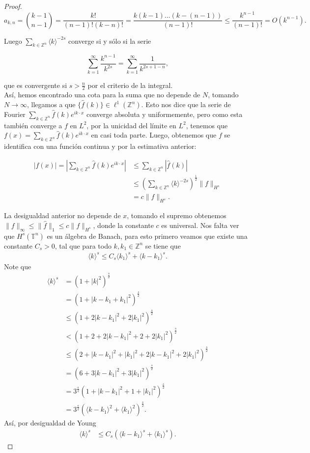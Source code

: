 \documentclass[12pt]{article}
\newcommand\Z{\ensuremath{\mathbb{Z}}}
\newcommand\T{\mathbb{T}}
\renewcommand{\hat}{\widehat}
\newcommand\jk{\langle k\rangle}
\begin{document}
\begin{proof}
$$a_{k,n}=\binom{k-1}{n-1}= \frac{k!}{(n-1)!(k-n)!}=\frac{k(k-1)\ldots(k-(n-1))}{(n-1)!}\leq \frac{k^{n-1}}{(n-1)!}=O(k^{n-1}).$$ 

Luego $\displaystyle\sum_{k \in \Z^n}\jk^{-2s}$ converge si y sólo si la serie

$$\sum_{k=1}^{\infty} \frac{k^{n-1}}{k^{2s}}=\sum_{k=1}^{\infty} \frac{1}{k^{2s+1-n}},$$

que es convergente si $s>\frac{n}{2}$ por el criterio de la integral.\\

Así, hemos encontrado una cota para la suma que no depende de $N$, tomando $N \rightarrow \infty$, llegamos a que $\{\widehat{f}(k)\} \in \ell^1(\mathbb{Z}^n)$. Esto nos dice que la serie de Fourier $\displaystyle\sum_{k\in \Z^n} \widehat{f}(k) e^{i k \cdot x}$ converge absoluta y uniformemente, pero como esta también converge a $f$ en $L^2$, por la unicidad del límite en $L^2$, tenemos que $f(x)=\displaystyle\sum_{k\in \Z^n} \widehat{f}(k) e^{i k \cdot x}$ en casi toda parte. Luego, obtenemos que $f$ se identifica con una función continua y por la estimativa anterior:


$$
\begin{aligned}
|f(x)|=\left|\sum_{k\in \Z^n} \widehat{f}(k) e^{i k\cdot x}\right| & \leq \sum_{k\in \Z^n}|\widehat{f}(k)| \\
& \leq\left(\sum_{k\in \Z^n}\langle k\rangle^{-2 s}\right)^{\frac{1}{2}}\|f\|_{H^s}\\
&=c\|f\|_{H^s}.
\end{aligned}
$$

La desigualdad anterior no depende de $x$, tomando el supremo obtenemos $\|f\|_{\infty}\leq \|\hat{f}\|_1\leq c\|f\|_{H^s}$, donde la constante $c$ es universal. Nos falta ver que $H^s(\T^n)$ es un álgebra de Banach, para  esto primero veamos que existe una constante $C_s>0$, tal que para todo $k,k_1\in \Z^{n}$ se tiene que 
\begin{align*}
    \langle k \rangle ^{s}\leq C_s \langle k_1\rangle^{s} +\langle k-k_1 \rangle^{s}
.\end{align*}
Note que 
\begin{align*}
    \langle k \rangle ^{s}&=(1+|k|^{2})^{\frac{s}{2}}\\
    &= (1+|k-k_1+k_1|^{2})^{\frac{s}{2}}\\
    &\leq (1+2|k-k_1|^{2}+2|k_1|^{2})^{\frac{s}{2}}\\
    & <(1+2+2|k-k_1|^{2}+2+2|k_1|^{2})^{\frac{s}{2}}\\
    &\leq (2+|k-k_1|^{2}+|k_1|^{2}+2|k-k_1|^{2}+2|k_1|^{2})^{\frac{s}{2}}\\ 
    &=(6+3|k-k_1|^{2}+3|k_1|^{2})^{\frac{s}{2}}\\
    &= 3^{\frac{s}{2}} (1+|k-k_1|^{2}+1+|k_1|^{2})^{\frac{s}{2}}\\
    &=3^{\frac{s}{2}} (\langle k-k_1\rangle^{2}+\langle k_1\rangle^{2})^{\frac{s}{2}}
.\end{align*}
Así, por desigualdad de Young
\begin{align*}
    \langle k \rangle ^{s}&\leq C_s (\langle k-k_1\rangle^{s}+\langle k_1\rangle^{s})
.\end{align*}


\end{proof}
\end{document}
